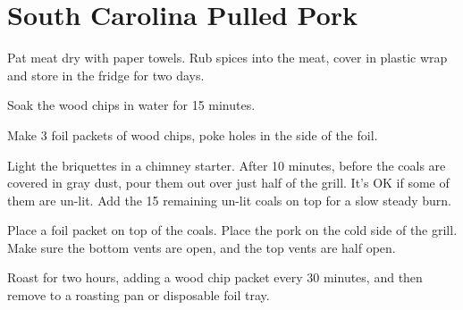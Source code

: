 \section{South Carolina Pulled Pork}
\begin{recipe}


Pat meat dry with paper towels. Rub spices into the meat, cover in plastic wrap and store in the fridge for two days.


Soak the wood chips in water for 15 minutes.

Make 3 foil packets of wood chips, poke holes in the side of the foil.


Light the briquettes in a chimney starter. After 10 minutes, before the coals are covered in gray dust, pour them out over just half of the grill.
It's OK if some of them are un-lit. Add the 15 remaining un-lit coals on top for a slow steady burn.

Place a foil packet on top of the coals. Place the pork on the cold side of the grill.
Make sure the bottom vents are open, and the top vents are half open.

Roast for two hours, adding a wood chip packet every 30 minutes, and then remove to a roasting pan or disposable foil tray.



\end{recipe}

